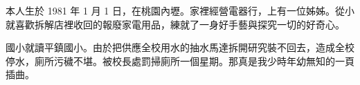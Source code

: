 本人生於 1981 年 1 月 1 日，在桃園內壢。家裡經營電器行，上有一位姊姊。從小就喜歡拆解店裡收回的報廢家電用品，練就了一身好手藝與探究一切的好奇心。

國小就讀平鎮國小。由於把供應全校用水的抽水馬達拆開研究裝不回去，造成全校停水，廁所污穢不堪。被校長處罰掃廁所一個星期。那真是我少時年幼無知的一頁插曲。
